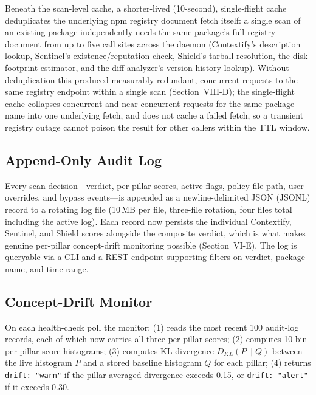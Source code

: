 \documentclass[journal]{IEEEtran}
\begin{document}
Beneath the scan-level cache, a shorter-lived (10-second), single-flight cache deduplicates the underlying
npm registry document fetch itself: a single scan of an existing package independently needs the same
package's full registry document from up to five call sites across the daemon (Contextify's description
lookup, Sentinel's existence/reputation check, Shield's tarball resolution, the disk-footprint estimator, and
the diff analyzer's version-history lookup). Without deduplication this produced measurably redundant,
concurrent requests to the same registry endpoint within a single scan (Section~VIII-D); the single-flight
cache collapses concurrent and near-concurrent requests for the same package name into one underlying fetch,
and does not cache a failed fetch, so a transient registry outage cannot poison the result for other callers
within the TTL window.

\subsection{Append-Only Audit Log}
Every scan decision---verdict, per-pillar scores, active flags, policy file path, user overrides, and bypass
events---is appended as a newline-delimited JSON (JSONL) record to a rotating log file (10\,MB per file,
three-file rotation, four files total including the active log). Each record now persists the individual
Contextify, Sentinel, and Shield scores alongside the composite verdict, which is what makes genuine
per-pillar concept-drift monitoring possible (Section~VI-E). The log is queryable via a CLI and a REST
endpoint supporting filters on verdict, package name, and time range.

\subsection{Concept-Drift Monitor}
On each health-check poll the monitor: (1) reads the most recent 100 audit-log records, each of which now
carries all three per-pillar scores; (2) computes 10-bin per-pillar score histograms; (3) computes KL
divergence $D_{KL}(P\|Q)$ between the live histogram $P$ and a stored baseline histogram $Q$ for each pillar;
(4) returns \texttt{drift: "warn"} if the pillar-averaged divergence exceeds 0.15, or \texttt{drift: "alert"}
if it exceeds 0.30.
\end{document}
